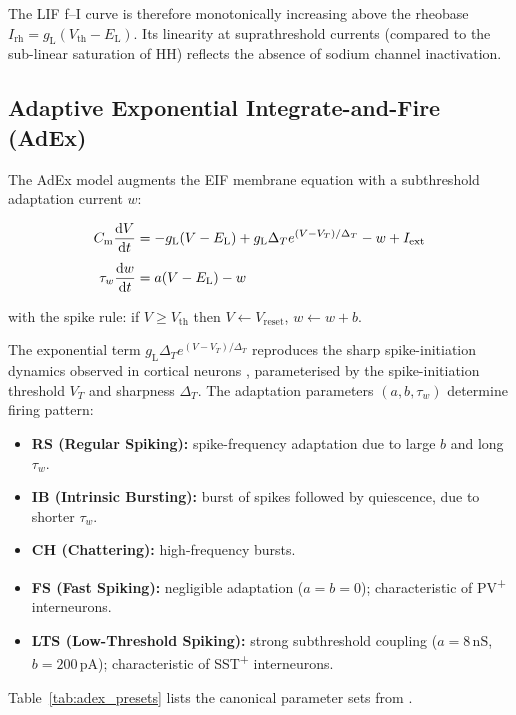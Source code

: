 \documentclass[11pt, a4paper, twocolumn]{article}
\newcommand{\Vth}{\ensuremath{V_{\mathrm{th}}}}
\newcommand{\Vreset}{\ensuremath{V_{\mathrm{reset}}}}
\newcommand{\EL}{\ensuremath{E_{\mathrm{L}}}}
\newcommand{\gL}{\ensuremath{g_{\mathrm{L}}}}
\newcommand{\Cm}{\ensuremath{C_{\mathrm{m}}}}
\newcommand{\tauw}{\ensuremath{\tau_{w}}}
\newcommand{\dT}{\ensuremath{\Delta_{T}}}
\newcommand{\pA}{\ensuremath{\,\mathrm{pA}}}
\newcommand{\nS}{\ensuremath{\,\mathrm{nS}}}
\begin{document}
The LIF f--I curve is therefore monotonically increasing above the rheobase
$I_{\mathrm{rh}} = \gL(\Vth - \EL)$. Its linearity at suprathreshold currents
(compared to the sub-linear saturation of HH) reflects the absence of sodium
channel inactivation.

\subsection{Adaptive Exponential Integrate-and-Fire (AdEx)}
\label{sec:adex}

The AdEx model \citep{Brette2005} augments the EIF membrane equation
\citep{Fourcaud2003} with a subthreshold adaptation current $w$:
\begin{keyequation}
\begin{align}
  \Cm \dv{V}{t} &= -\gL(V - \EL) + \gL \dT e^{(V-V_T)/\dT} - w + I_{\mathrm{ext}}
  \label{eq:adex_V}\\[4pt]
  \tauw \dv{w}{t} &= a(V - \EL) - w
  \label{eq:adex_w}
\end{align}
\end{keyequation}
with the spike rule: if $V \geq \Vth$ then $V \leftarrow \Vreset$,
$w \leftarrow w + b$.

The exponential term $\gL \dT e^{(V-V_T)/\dT}$ reproduces the sharp
spike-initiation dynamics observed in cortical neurons
\citep{Fourcaud2003}, parameterised by the spike-initiation threshold $V_T$
and sharpness $\dT$. The adaptation parameters $(a, b, \tauw)$ determine
firing pattern:
\begin{itemize}[itemsep=1pt, leftmargin=1.4em]
  \item \textbf{RS (Regular Spiking):} spike-frequency adaptation due to
    large $b$ and long $\tauw$.
  \item \textbf{IB (Intrinsic Bursting):} burst of spikes followed by
    quiescence, due to shorter $\tauw$.
  \item \textbf{CH (Chattering):} high-frequency bursts.
  \item \textbf{FS (Fast Spiking):} negligible adaptation ($a = b = 0$);
    characteristic of PV\textsuperscript{+} interneurons.
  \item \textbf{LTS (Low-Threshold Spiking):} strong subthreshold coupling
    ($a = 8\nS$, $b = 200\pA$); characteristic of SST\textsuperscript{+}
    interneurons.
\end{itemize}

Table~\ref{tab:adex_presets} lists the canonical parameter sets from
\citet{Naud2008}.
\end{document}
